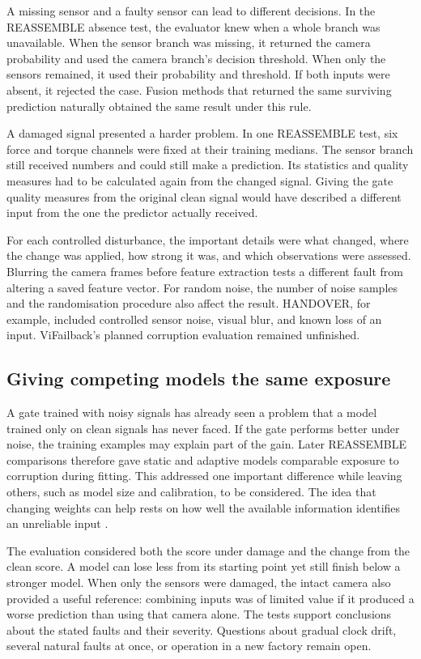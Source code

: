 A missing sensor and a faulty sensor can lead to different decisions. In the REASSEMBLE
absence test, the evaluator knew when a whole branch was unavailable. When the sensor
branch was missing, it returned the camera probability and used the camera branch’s
decision threshold. When only the sensors remained, it used their probability and
threshold. If both inputs were absent, it rejected the case. Fusion methods that
returned the same surviving prediction naturally obtained the same result under this
rule.

A damaged signal presented a harder problem. In one REASSEMBLE test, six force and
torque channels were fixed at their training medians. The sensor branch still received
numbers and could still make a prediction. Its statistics and quality measures had to be
calculated again from the changed signal. Giving the gate quality measures from the
original clean signal would have described a different input from the one the predictor
actually received.

For each controlled disturbance, the important details were what changed, where the
change was applied, how strong it was, and which observations were assessed. Blurring
the camera frames before feature extraction tests a different fault from altering a
saved feature vector. For random noise, the number of noise samples and the
randomisation procedure also affect the result. HANDOVER, for example, included
controlled sensor noise, visual blur, and known loss of an input. ViFailback’s planned
corruption evaluation remained unfinished.

\subsection{Giving competing models the same exposure}

A gate trained with noisy signals has already seen a problem that a model trained only
on clean signals has never faced. If the gate performs better under noise, the training
examples may explain part of the gain. Later REASSEMBLE comparisons therefore gave
static and adaptive models comparable exposure to corruption during fitting. This
addressed one important difference while leaving others, such as model size and
calibration, to be considered. The idea that changing weights can help rests on how well
the available information identifies an unreliable input \parencite{Zhang2023QMF}.

The evaluation considered both the score under damage and the change from the clean
score. A model can lose less from its starting point yet still finish below a stronger
model. When only the sensors were damaged, the intact camera also provided a useful
reference: combining inputs was of limited value if it produced a worse prediction than
using that camera alone. The tests support conclusions about the stated faults and their
severity. Questions about gradual clock drift, several natural faults at once, or
operation in a new factory remain open.

